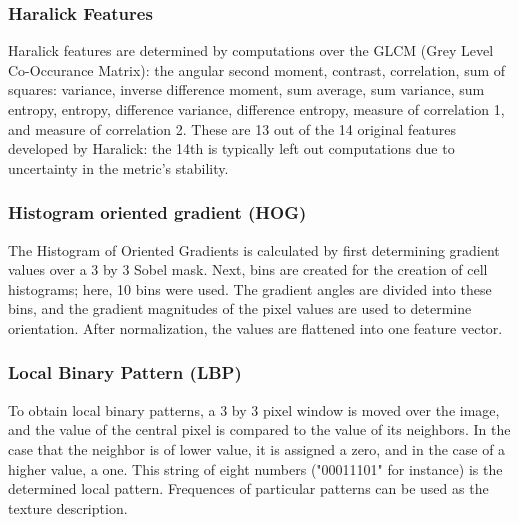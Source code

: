 
\subsubsection{Haralick Features}

Haralick features are determined by computations over the GLCM (Grey Level Co-Occurance Matrix): the angular second moment, contrast, correlation, sum of squares: variance, inverse difference moment, sum average, sum variance, sum entropy, entropy, difference variance, difference entropy, measure of correlation 1, and measure of correlation 2. These are 13 out of the 14 original features developed by Haralick: the 14th is typically left out computations due to uncertainty in the metric's stability. 

\subsubsection{Histogram oriented gradient (HOG)}

The Histogram of Oriented Gradients is calculated by first determining gradient values over a 3 by 3 Sobel mask. Next, bins are created for the creation of cell histograms; here, 10 bins were used. The gradient angles are divided into these bins, and the gradient magnitudes of the pixel values are used to determine orientation. After normalization, the values are flattened into one feature vector. 

\subsubsection{Local Binary Pattern (LBP)}

To obtain local binary patterns, a 3 by 3 pixel window is moved over the image, and the value of the central pixel is compared to the value of its neighbors. In the case that the neighbor is of lower value, it is assigned a zero, and in the case of a higher value, a one. This string of eight numbers ("00011101" for instance) is the determined local pattern. Frequences of particular patterns can be used as the texture description. 
  
  

  